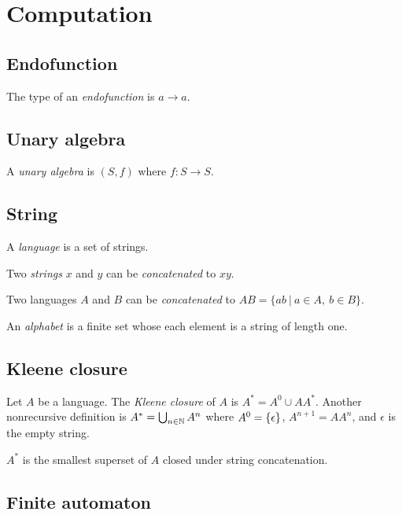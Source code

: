 \chapter{Computation}

\section{Endofunction}

%
The type of an \emph{endofunction} is \(a \to a\).

\section{Unary algebra}

%
A \emph{unary algebra} is \((S,f)\) where \(f : S \to S\).

\section{String}

%
A \emph{language} is a set of strings.

Two
%
\emph{strings}
\(x\) and \(y\) can be
%
%
\emph{concatenated} to \(xy\).

Two languages \(A\) and \(B\) can be
%
%
\emph{concatenated} to
\(AB = \{ ab ~|~ a \in A, ~ b \in B \}\).

%
An \emph{alphabet} is a finite set whose each element is a string of length one.

\section{Kleene closure}

Let \(A\) be a language.
The
%
%
%
\emph{Kleene closure}
of \(A\) is \(A^* = A^0 \cup AA^*\).
Another nonrecursive definition is
\( A^* = \bigcup_{n \in \mathbb{N}} A^n \)
where \( A^0 = \{\epsilon\} \),
\( A^{n+1} = A A^n \),
and \(\epsilon\) is the
%
%
empty string.

\(A^*\) is the smallest superset of \(A\)
closed under string concatenation.

\section{Finite automaton}

